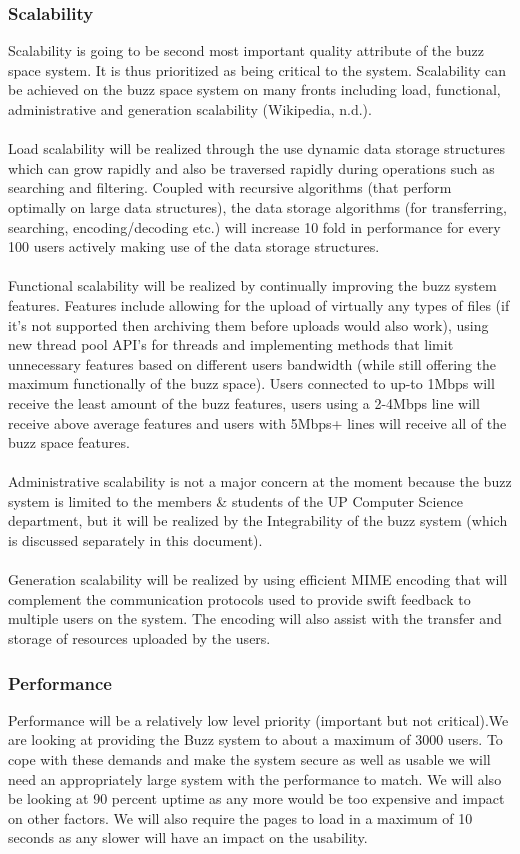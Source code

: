 ﻿\subsubsection{Scalability}
Scalability is going to be second most important quality attribute of the buzz space system. It is thus prioritized as being critical to the system. Scalability can be achieved on the buzz space system on many fronts including load, functional, administrative and generation scalability (Wikipedia, n.d.).\\
\\
Load scalability will be realized through the use dynamic data storage structures which can grow rapidly and also be traversed rapidly during operations such as searching and filtering. Coupled with recursive algorithms (that perform optimally on large data structures), the data storage algorithms (for transferring, searching, encoding/decoding etc.) will increase 10 fold in performance for every 100 users actively making use of the data storage structures.\\
\\
Functional scalability will be realized by continually improving the buzz system features. Features include allowing for the upload of virtually any types of files (if it’s not supported then archiving them before uploads would also work), using new thread pool API’s for threads and implementing methods that limit unnecessary features based on different users bandwidth (while still offering the maximum functionally of the buzz space). Users connected to up-to 1Mbps will receive the least amount of the buzz features, users using a 2-4Mbps line will receive above average features and users with 5Mbps+ lines will receive all of the buzz space features.\\
\\ 
Administrative scalability is not a major concern at the moment because the buzz system is limited to the members & students of the UP Computer Science department, but it will be realized by the Integrability of the buzz system (which is discussed separately in this document).\\
\\
Generation scalability will be realized by using efficient MIME encoding that will complement the communication protocols used to provide swift feedback to multiple users on the system. The encoding will also assist with the transfer and storage of resources uploaded by the users.     
\subsubsection{Performance}
Performance will be a relatively low level priority (important but not critical).We are looking at providing the Buzz system to about a maximum of 3000 users. To cope with these demands and make the system secure as well as usable we will need an appropriately large system with the performance to match. We will also be looking at 90 percent uptime as any more would be too expensive and impact on other factors. We will also require the pages to load in a maximum of 10 seconds as any slower will have an impact on the usability.
